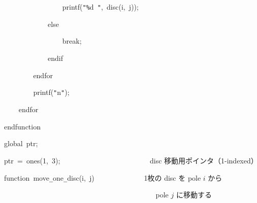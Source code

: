 \documentclass[a4paper,10pt]{article}
\def\mc{\relax}
\begin{document}
\noindent
\mbox{}{\tt\mc \ }{\tt\mc \ }{\tt\mc \ }{\tt\mc \ }{\tt\mc \ }{\tt\mc \ }{\tt\mc \ }{\tt\mc \ }{\tt\mc \ }{\tt\mc \ }{\tt\mc \ }{\tt\mc \ }{\tt\mc \ }{\tt\mc \ }{\tt\mc \ }{\tt\mc \ }printf({\tt "}{\tt\%}d{\tt\mc \ }{\tt "},{\tt\mc \ }disc(i,{\tt\mc \ }j));

\noindent
\mbox{}{\tt\mc \ }{\tt\mc \ }{\tt\mc \ }{\tt\mc \ }{\tt\mc \ }{\tt\mc \ }{\tt\mc \ }{\tt\mc \ }{\tt\mc \ }{\tt\mc \ }{\tt\mc \ }{\tt\mc \ }else

\noindent
\mbox{}{\tt\mc \ }{\tt\mc \ }{\tt\mc \ }{\tt\mc \ }{\tt\mc \ }{\tt\mc \ }{\tt\mc \ }{\tt\mc \ }{\tt\mc \ }{\tt\mc \ }{\tt\mc \ }{\tt\mc \ }{\tt\mc \ }{\tt\mc \ }{\tt\mc \ }{\tt\mc \ }break;

\noindent
\mbox{}{\tt\mc \ }{\tt\mc \ }{\tt\mc \ }{\tt\mc \ }{\tt\mc \ }{\tt\mc \ }{\tt\mc \ }{\tt\mc \ }{\tt\mc \ }{\tt\mc \ }{\tt\mc \ }{\tt\mc \ }endif

\noindent
\mbox{}{\tt\mc \ }{\tt\mc \ }{\tt\mc \ }{\tt\mc \ }{\tt\mc \ }{\tt\mc \ }{\tt\mc \ }{\tt\mc \ }endfor

\noindent
\mbox{}{\tt\mc \ }{\tt\mc \ }{\tt\mc \ }{\tt\mc \ }{\tt\mc \ }{\tt\mc \ }{\tt\mc \ }{\tt\mc \ }printf({\tt "}{\tt{}}n{\tt "});

\noindent
\mbox{}{\tt\mc \ }{\tt\mc \ }{\tt\mc \ }{\tt\mc \ }endfor

\noindent
\mbox{}endfunction

\noindent
\mbox{}\hfill

\noindent
\mbox{}global{\tt\mc \ }ptr;

\noindent
\mbox{}ptr{\tt\mc \ }={\tt\mc \ }ones(1,{\tt\mc \ }3);{\tt\mc \ }{\tt\mc \ }{\tt\mc \ }{\tt\mc \ }{\tt\mc \ }{\tt\mc \ }{\tt\mc \ }{\tt\mc \ }{\tt\mc \ }{\tt\mc \ }{\tt\mc \ }{\tt\mc \ }{\tt\mc \ }{\tt\mc \ }{\tt\mc \ }{\tt\mc \ }{\tt\mc \ }{\tt\mc \ }{\tt\mc \ }{\tt\mc \ }{\tt\mc \ }{\tt\mc \ }{\tt\mc \ }\rm\mc {\tt\%} \ disc 移動用ポインタ（1-indexed）\hfill
\tt\mc 

\noindent
\mbox{}\hfill

\noindent
\mbox{}function{\tt\mc \ }move{\tt\_}one{\tt\_}disc(i,{\tt\mc \ }j){\tt\mc \ }{\tt\mc \ }{\tt\mc \ }{\tt\mc \ }{\tt\mc \ }{\tt\mc \ }{\tt\mc \ }{\tt\mc \ }{\tt\mc \ }{\tt\mc \ }{\tt\mc \ }{\tt\mc \ }\rm\mc {\tt\%} \ 1枚の disc を pole $i$ から\hfill
\tt\mc 

\noindent
\mbox{}{\tt\mc \ }{\tt\mc \ }{\tt\mc \ }{\tt\mc \ }{\tt\mc \ }{\tt\mc \ }{\tt\mc \ }{\tt\mc \ }{\tt\mc \ }{\tt\mc \ }{\tt\mc \ }{\tt\mc \ }{\tt\mc \ }{\tt\mc \ }{\tt\mc \ }{\tt\mc \ }{\tt\mc \ }{\tt\mc \ }{\tt\mc \ }{\tt\mc \ }{\tt\mc \ }{\tt\mc \ }{\tt\mc \ }{\tt\mc \ }{\tt\mc \ }{\tt\mc \ }{\tt\mc \ }{\tt\mc \ }{\tt\mc \ }{\tt\mc \ }{\tt\mc \ }{\tt\mc \ }{\tt\mc \ }{\tt\mc \ }{\tt\mc \ }{\tt\mc \ }{\tt\mc \ }{\tt\mc \ }{\tt\mc \ }{\tt\mc \ }\rm\mc {\tt\%} \ pole $j$ に移動する \hfill
\tt\mc 
\end{document}
